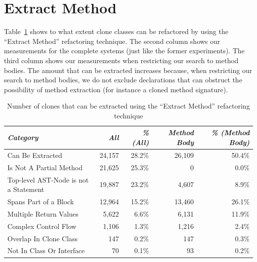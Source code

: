 \section{Extract Method}
Table~\ref{tab:refactorability} shows to what extent clone classes can be refactored by using the ``Extract Method'' refactoring technique. The second column shows our measurements for the complete systems (just like the former experiments). The third column shows our measurements when restricting our search to method bodies. %
The amount that can be extracted increases because, when restricting our search to method bodies, we do not exclude declarations that can obstruct the possibility of method extraction (for instance a cloned method signature).
\begin{table}[H]
\centering
\begin{tabular}{@{}lrrrr@{}}
\toprule
\textit{\textbf{Category}} & \textit{\textbf{All}} & \textit{\textbf{\% (All)}} & \textit{\textbf{Method Body}} & \textit{\textbf{\% (Method Body)}} \\ \midrule
Can Be Extracted & 24,157 & 28.2\% & 26,109 & 50.4\% \\
Is Not A Partial Method & 21,625 & 25.3\% & 0 & 0.0\% \\
Top-level AST-Node is not a Statement & 19,887 & 23.2\% & 4,607 & 8.9\% \\
Spans Part of a Block & 12,964 & 15.2\% & 13,460 & 26.1\% \\
Multiple Return Values & 5,622 & 6.6\% & 6,131 & 11.9\% \\
Complex Control Flow & 1,106 & 1.3\% & 1,216 & 2.4\% \\
Overlap In Clone Class & 147 & 0.2\% & 147 & 0.3\% \\
Not In Class Or Interface & 70 & 0.1\% & 93 & 0.2\% \\
\bottomrule
\end{tabular}
\caption{Number of clones that can be extracted using the ``Extract Method'' refactoring technique}
\label{tab:refactorability}
\end{table}

